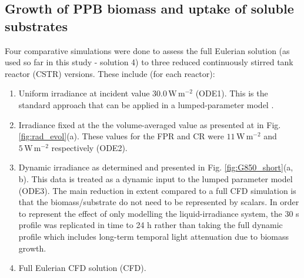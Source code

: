 \subsection{Growth of PPB biomass and uptake of soluble substrates}
\label{ssec:ppb_growth}
Four comparative simulations were done to assess the full Eulerian solution (as used so far in this study - solution 4) to three reduced continuously stirred tank reactor (CSTR) versions. These include (for each reactor):

\begin{enumerate}
    \item Uniform irradiance at incident value $\mathrm{30.0\, W\, m^{-2}}$ (ODE1). This is the standard approach that can be applied in a lumped-parameter model \cite{bechet2013}.
    \item Irradiance fixed at the the volume-averaged value as presented at in Fig. \ref{fig:rad_evol}(a). These values for the FPR and CR were $\mathrm{11\, W\, m^{-2}}$ and $\mathrm{5\, W\, m^{-2}}$ respectively (ODE2).
    \item Dynamic irradiance as determined and presented in Fig. \ref{fig:G850_short}(a, b). This data is treated as a dynamic input to the lumped parameter model (ODE3). The main reduction in extent compared to a full CFD simulation is that the biomass/substrate do not need to be represented by scalars. In order to represent the effect of only modelling the liquid-irradiance system, the 30 s profile was replicated in time to 24 h rather than taking the full dynamic profile which includes long-term temporal light attenuation due to biomass growth.
    \item Full Eulerian CFD solution (CFD).
\end{enumerate}


